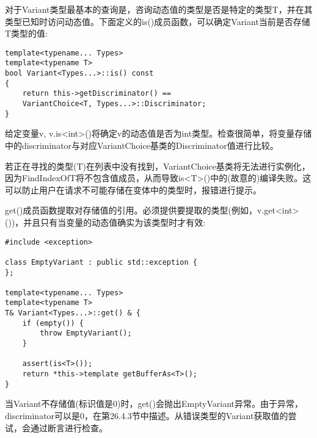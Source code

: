 对于Variant类型最基本的查询是，咨询动态值的类型是否是特定的类型T，并在其类型已知时访问动态值。下面定义的is()成员函数，可以确定Variant当前是否存储T类型的值:

\begin{lstlisting}[style=styleCXX]
template<typename... Types>
template<typename T>
bool Variant<Types...>::is() const
{
	return this->getDiscriminator() ==
	VariantChoice<T, Types...>::Discriminator;
}
\end{lstlisting}

给定变量v, v.is<int>()将确定v的动态值是否为int类型。检查很简单，将变量存储中的discriminator与对应VariantChoice基类的Discriminator值进行比较。

若正在寻找的类型(T)在列表中没有找到，VariantChoice基类将无法进行实例化，因为FindIndexOfT将不包含值成员，从而导致is<T>()中的(故意的)编译失败。这可以防止用户在请求不可能存储在变体中的类型时，报错进行提示。

get()成员函数提取对存储值的引用。必须提供要提取的类型(例如，v.get<int>())，并且只有当变量的动态值确实为该类型时才有效:

\begin{lstlisting}[style=styleCXX]
#include <exception>

class EmptyVariant : public std::exception {
};

template<typename... Types>
template<typename T>
T& Variant<Types...>::get() & {
	if (empty()) {
		throw EmptyVariant();
	}

	assert(is<T>());
	return *this->template getBufferAs<T>();
}
\end{lstlisting}

当Variant不存储值(标识值是0)时，get()会抛出EmptyVariant异常。由于异常，discriminator可以是0，在第26.4.3节中描述。从错误类型的Variant获取值的尝试，会通过断言进行检查。













































